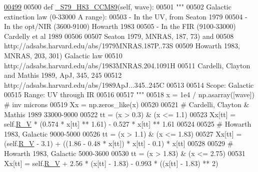 \begin{DoxyVerb}
\begin{DoxyCode}
\hypertarget{classpyneb_1_1extinction_1_1red__corr_1_1_red_corr_l00499}{}\hyperlink{classpyneb_1_1extinction_1_1red__corr_1_1_red_corr_a5ca5f455ff115c36f4ea3367542cbafa}{00499} 
00500     \textcolor{keyword}{def }\hyperlink{classpyneb_1_1extinction_1_1red__corr_1_1_red_corr_a5ca5f455ff115c36f4ea3367542cbafa}{\_S79\_H83\_CCM89}(self, wave):
00501         \textcolor{stringliteral}{"""}
00502 \textcolor{stringliteral}{        Galactic extinction law (0-33000 A range):}
00503 \textcolor{stringliteral}{        - In the UV, from Seaton 1979}
00504 \textcolor{stringliteral}{        - In the opt/NIR (3600-9100) Howarth 1983}
00505 \textcolor{stringliteral}{        - In the FIR (9100-33000) Cardelly et al 1989}
00506 \textcolor{stringliteral}{        }
00507 \textcolor{stringliteral}{        Seaton 1979, MNRAS, 187, 73) and }
00508 \textcolor{stringliteral}{        http://adsabs.harvard.edu/abs/1979MNRAS.187P..73S}
00509 \textcolor{stringliteral}{        Howarth 1983, MNRAS, 203, 301) Galactic law}
00510 \textcolor{stringliteral}{        http://adsabs.harvard.edu/abs/1983MNRAS.204.1091H}
00511 \textcolor{stringliteral}{        Cardelli, Clayton and Mathis 1989, ApJ, 345, 245}
00512 \textcolor{stringliteral}{        http://adsabs.harvard.edu/abs/1989ApJ...345..245C}
00513 \textcolor{stringliteral}{        }
00514 \textcolor{stringliteral}{        Scope: Galactic}
00515 \textcolor{stringliteral}{        Range: UV through IR}
00516 \textcolor{stringliteral}{        }
00517 \textcolor{stringliteral}{        """}
00518         x = 1e4 / np.asarray([wave]) \textcolor{comment}{# inv microns}
00519         Xx = np.zeros\_like(x)
00520 
00521         \textcolor{comment}{# Cardelli, Clayton & Mathis 1989 33000-9000}
00522         tt = (x > 0.3) & (x <= 1.1)
00523         Xx[tt] = self.\hyperlink{classpyneb_1_1extinction_1_1red__corr_1_1_red_corr_a4696ecdd84c912c20e6aa19b1573e875}{R\_V} * (0.574 * x[tt] ** 1.61) - 0.527 * x[tt] ** 1.61
00524         
00525         \textcolor{comment}{# Howarth 1983, Galactic 9000-5000}
00526         tt = (x > 1.1) & (x <= 1.83)
00527         Xx[tt] = (self.\hyperlink{classpyneb_1_1extinction_1_1red__corr_1_1_red_corr_a4696ecdd84c912c20e6aa19b1573e875}{R\_V} - 3.1) + ((1.86 - 0.48 * x[tt]) * x[tt] - 0.1) * x[tt]
00528         
00529         \textcolor{comment}{# Howarth 1983, Galactic 5000-3600}
00530         tt = (x > 1.83) & (x <= 2.75)
00531         Xx[tt] = self.\hyperlink{classpyneb_1_1extinction_1_1red__corr_1_1_red_corr_a4696ecdd84c912c20e6aa19b1573e875}{R\_V} + 2.56 * (x[tt] - 1.83) - 0.993 * ((x[tt] - 1.83) ** 2)

\end{DoxyCode}
\end{DoxyVerb}

